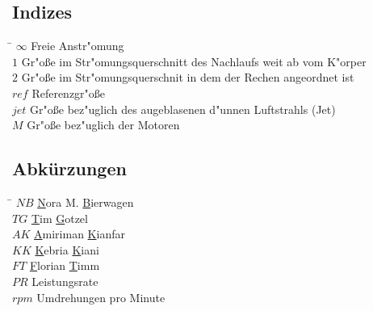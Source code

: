 \subsection*{Indizes}
\begin{tabbing}
\hspace*{2cm}\=\kill
$\infty$ \> Freie Anstr"omung \\[0.2ex]
$1$ \> Gr"o\ss{}e im Str"omungsquerschnitt des Nachlaufs weit ab vom K"orper \\[0.2ex]
$2$ \> Gr"o\ss{}e im Str"omungsquerschnit in dem der Rechen angeordnet ist \\[0.2ex]
$ref$ \> Referenzgr"o\ss{}e \\[0.2ex]
$jet$ \> Gr"o\ss{}e bez"uglich des augeblasenen d"unnen Luftstrahls (Jet) \\[0.2ex]
$M$ \> Gr"o\ss{}e bez"uglich der Motoren \\[0.2ex]
\end{tabbing}



\subsection*{Abk\"urzungen}
\begin{tabbing}
\hspace*{2cm}\=\kill
$NB$ \> \underline{N}ora M. \underline{B}ierwagen \\[0.2ex]
$TG$ \> \underline{T}im \underline{G}otzel \\[0.2ex]
$AK$ \> \underline{A}miriman \underline{K}ianfar \\[0.2ex]
$KK$ \> \underline{K}ebria \underline{K}iani \\[0.2ex]
$FT$ \> \underline{F}lorian \underline{T}imm \\[0.2ex]
$PR$ \> Leistungsrate \\[0.2ex]
$rpm$ \> Umdrehungen pro Minute \\[0.2ex]
\end{tabbing}

